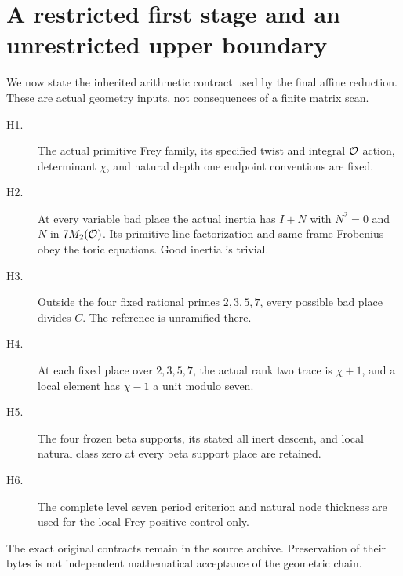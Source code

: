 \section{A restricted first stage and an unrestricted upper boundary}\label{sec:ramification}
We now state the inherited arithmetic contract used by the final affine reduction. These are actual geometry inputs, not consequences of a finite matrix scan.
\begin{description}
\item[H1.] The actual primitive Frey family, its specified twist and integral $\mathcal O$ action, determinant $\chi$, and natural depth one endpoint conventions are fixed.
\item[H2.] At every variable bad place the actual inertia has $I+N$ with $N^2=0$ and $N$ in $7M_2(\mathcal O)$. Its primitive line factorization and same frame Frobenius obey the toric equations. Good inertia is trivial.
\item[H3.] Outside the four fixed rational primes $2,3,5,7$, every possible bad place divides $C$. The reference is unramified there.
\item[H4.] At each fixed place over $2,3,5,7$, the actual rank two trace is $\chi+1$, and a local element has $\chi-1$ a unit modulo seven.
\item[H5.] The four frozen beta supports, its stated all inert descent, and local natural class zero at every beta support place are retained.
\item[H6.] The complete level seven period criterion and natural node thickness are used for the local Frey positive control only.
\end{description}
The exact original contracts remain in the source archive. Preservation of their bytes is not independent mathematical acceptance of the geometric chain.

